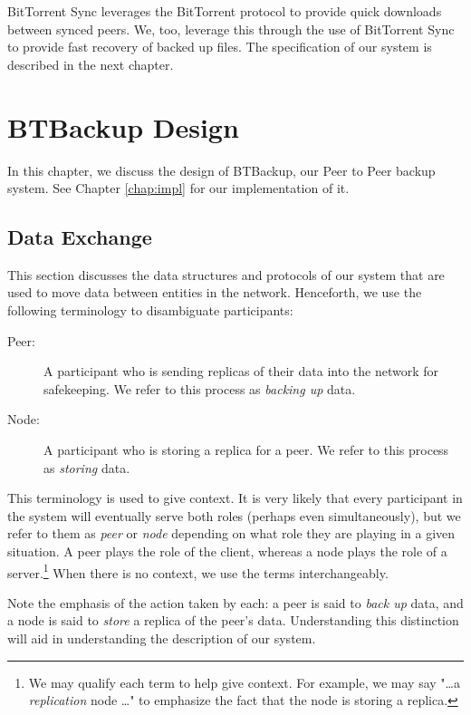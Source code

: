 \documentclass[12pt]{report}
\begin{document}
BitTorrent Sync leverages the BitTorrent protocol to provide quick downloads between synced peers. We, too, leverage this through the use of BitTorrent Sync to provide fast recovery of backed up files. The specification of our system is described in the next chapter.

\chapter{BTBackup Design} \label{chap:BTBackup}

In this chapter, we discuss the design of BTBackup, our Peer to Peer backup system. See Chapter \ref{chap:impl} for our implementation of it.

\section{Data Exchange} \label{sec:DataExchange}

This section discusses the data structures and protocols of our system that are used to move data between entities in the network. Henceforth, we use the following terminology to disambiguate participants:

\begin{description}
  \item[Peer:] A participant who is sending replicas of their data into the network for safekeeping. We refer to this process as \textit{backing up} data.
  \item[Node:] A participant who is storing a replica for a peer. We refer to this process as \textit{storing} data.
\end{description}

This terminology is used to give context. It is very likely that every participant in the system will eventually serve both roles (perhaps even simultaneously), but we refer to them as \textit{peer} or \textit{node} depending on what role they are playing in a given situation. A peer plays the role of the client, whereas a node plays the role of a server.\footnote{We may qualify each term to help give context. For example, we may say "\ldots a \textit{replication} node \ldots" to emphasize the fact that the node is storing a replica.} When there is no context, we use the terms interchangeably.

Note the emphasis of the action taken by each: a peer is said to \textit{back up} data, and a node is said to \textit{store} a replica of the peer's data. Understanding this distinction will aid in understanding the description of our system.
\end{document}
